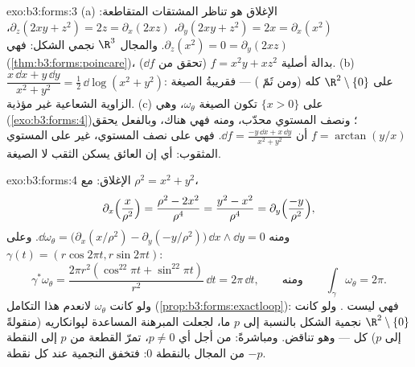 \begin{solution}{exo:b3:forms:3}
(a) الإغلاق هو تناظر المشتقات المتقاطعة: $\partial_y(2xy + z^2) = 2x = \partial_x(x^2)$، $\partial_z(2xy + z^2) = 2z = \partial_x(2xz)$، $\partial_z(x^2) = 0 = \partial_y(2xz)$.
والمجال $\R^3$ نجمي الشكل: فهي  (\cref{thm:b3:forms:poincare})، بدالة أصلية
$f = x^2y + xz^2$ (تحقق من $\dd f$).
(b) $\dfrac{x\,\dd x + y\,\dd y}{x^2 + y^2} =
\tfrac12\,\dd\log(x^2 + y^2)$:  على $\R^2\setminus\{0\}$ كله (ومن ثَمّ ) --- فقريبةُ
الصيغة الزاوية الشعاعية غير مؤذية.
(c) على $\{x > 0\}$ تكون الصيغة $\omega_\theta$، وهي 
(\cref{exo:b3:forms:4})؛ ونصف المستوي محدّب، ومنه فهي  هناك، وبالفعل
يحقق $f = \arctan(y/x)$ أن $\dd f
= \frac{-y\,\dd x + x\,\dd y}{x^2 + y^2}$. فهي  على نصف المستوي، غير  على
المستوي المثقوب: أي إن العائق يسكن الثقب لا الصيغة.
\end{solution}

\begin{solution}{exo:b3:forms:4}
الإغلاق: مع $\rho^2 = x^2 + y^2$،
\[
\partial_x\Bigl(\frac{x}{\rho^2}\Bigr) = \frac{\rho^2 -
2x^2}{\rho^4} = \frac{y^2 - x^2}{\rho^4} =
\partial_y\Bigl(\frac{-y}{\rho^2}\Bigr),
\]
ومنه $\dd\omega_\theta = \bigl(\partial_x(x/\rho^2) -
\partial_y(-y/\rho^2)\bigr)\,\dd x\wedge\dd y = 0$. وعلى $\gamma(t) = (r\cos2\pi t, r\sin2\pi t)$:
\[
\gamma^*\omega_\theta = \frac{2\pi r^2(\cos^22\pi t +
\sin^22\pi t)}{r^2}\,\dd t = 2\pi\,\dd t,
\qquad\text{ومنه}\qquad
\int_\gamma\omega_\theta = 2\pi .
\] ولو كانت $\omega_\theta$  لانعدم هذا التكامل
(\cref{prop:b3:forms:exactloop}): فهي ليست . ولو كانت $\R^2\setminus\{0\}$ نجمية الشكل
بالنسبة إلى $p$ ما، لجعلت المبرهنة المساعدة لپوانكاريه
(منقولةً إلى $p$) كل   --- وهو تناقض. ومباشرةً:
من أجل أي $p
\neq 0$، تمرّ القطعة من $p$ إلى النقطة $-p$ من المجال
بالنقطة $0$: فتخفق النجمية عند كل نقطة.
\end{solution}

